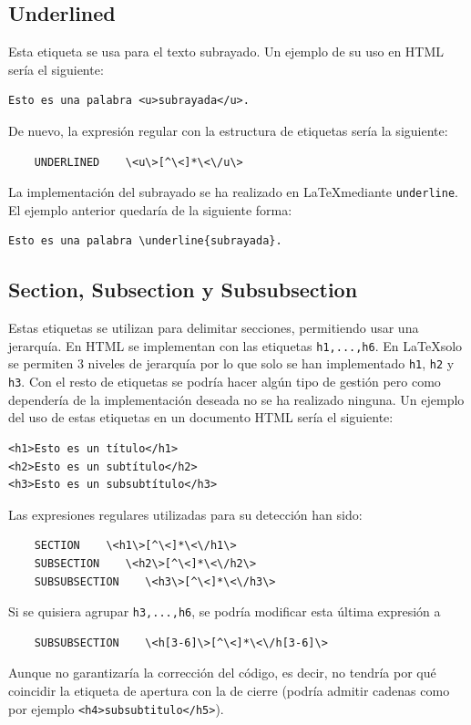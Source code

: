 \documentclass[12pt]{article}
\begin{document}
\subsection{Underlined}
Esta etiqueta se usa para el texto subrayado. Un ejemplo de su uso en HTML sería el siguiente:
\begin{verbatim}
Esto es una palabra <u>subrayada</u>.
\end{verbatim}
De nuevo, la expresión regular con la estructura de etiquetas sería la siguiente:
\begin{verbatim}
    UNDERLINED    \<u\>[^\<]*\<\/u\>
\end{verbatim}
La implementación del subrayado se ha realizado en \LaTeX mediante \verb|underline|. El ejemplo anterior quedaría de la siguiente forma:
\begin{verbatim}
Esto es una palabra \underline{subrayada}.
\end{verbatim}

\subsection{Section, Subsection y Subsubsection}
Estas etiquetas se utilizan para delimitar secciones, permitiendo usar una jerarquía. En HTML se implementan con las etiquetas \verb|h1,...,h6|. En \LaTeX solo se permiten 3 niveles de jerarquía por lo que solo se han implementado \verb|h1|, \verb|h2| y \verb|h3|. Con el resto de etiquetas se podría hacer algún tipo de gestión pero como dependería de la implementación deseada no se ha realizado ninguna. Un ejemplo del uso de estas etiquetas en un documento HTML sería el siguiente:
\begin{verbatim}
<h1>Esto es un título</h1>
<h2>Esto es un subtítulo</h2>
<h3>Esto es un subsubtítulo</h3>
\end{verbatim}
Las expresiones regulares utilizadas para su detección han sido:
\begin{verbatim}
    SECTION    \<h1\>[^\<]*\<\/h1\>
    SUBSECTION    \<h2\>[^\<]*\<\/h2\>
    SUBSUBSECTION    \<h3\>[^\<]*\<\/h3\>
\end{verbatim}
Si se quisiera agrupar \verb|h3,...,h6|, se podría modificar esta última expresión a
\begin{verbatim}
    SUBSUBSECTION    \<h[3-6]\>[^\<]*\<\/h[3-6]\>
\end{verbatim}
Aunque no garantizaría la corrección del código, es decir, no tendría por qué coincidir la etiqueta de apertura con la de cierre (podría admitir cadenas como por ejemplo \verb|<h4>subsubtitulo</h5>|). \\
\end{document}
